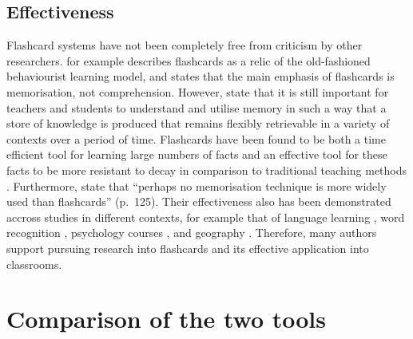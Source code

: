 \subsection{Effectiveness}

Flashcard systems have not been completely free from criticism by other researchers.  for example describes flashcards as a relic of the old-fashioned behaviourist learning model, and  states that the main emphasis of flashcards is memorisation, not comprehension. However,  state that it is still important for teachers and students to understand and utilise memory in such a way that a store of knowledge is produced that remains flexibly retrievable in a variety of contexts over a period of time. Flashcards have been found to be both a time efficient tool for learning large numbers of facts and an effective tool for these facts to be more resistant to decay in comparison to traditional teaching methods \cite{nakata}. Furthermore,  state that ``perhaps no memorisation technique is more widely used than flashcards'' (p.~125). Their effectiveness also has been demonstrated accross studies in different contexts, for example that of language learning \cite{chien, macquarrie, mccullough, nakata}, word recognition \cite{joseph}, psychology courses \cite{burgess, golding}, and geography \cite{zirkle}. Therefore, many authors support pursuing research into flashcards and its effective application into classrooms.

\section{Comparison of the two tools}
\label{sec:comparison}

